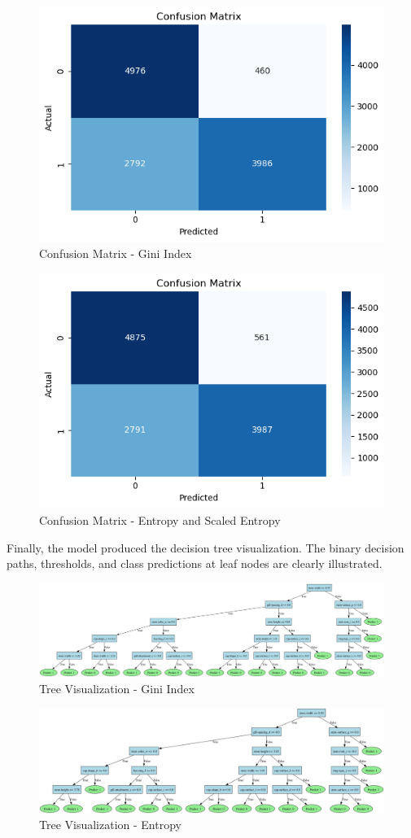 \documentclass{article}
\begin{document}
\begin{figure}[H]
\centering
\includegraphics[width=0.5\linewidth]{CM-Gini.png}
\caption{\label{fig:frog}Confusion Matrix - Gini Index}
\end{figure}

\begin{figure}[H]
\centering
\includegraphics[width=0.5\linewidth]{CM-SE.E.png}
\caption{\label{fig:frog}Confusion Matrix - Entropy and Scaled Entropy}
\end{figure}

Finally, the model produced the decision tree visualization. The binary decision paths, thresholds, and class predictions at leaf nodes are clearly illustrated.

\begin{figure}[H]
\centering
\includegraphics[width=1\linewidth]{Tree_Visual_Gini.jpg}
\caption{\label{fig:frog}Tree Visualization - Gini Index}
\end{figure}


\begin{figure}[H]
\centering
\includegraphics[width=1\linewidth]{Tree_Visual_E.jpg}
\caption{\label{fig:frog}Tree Visualization - Entropy}
\end{figure}
\end{document}

